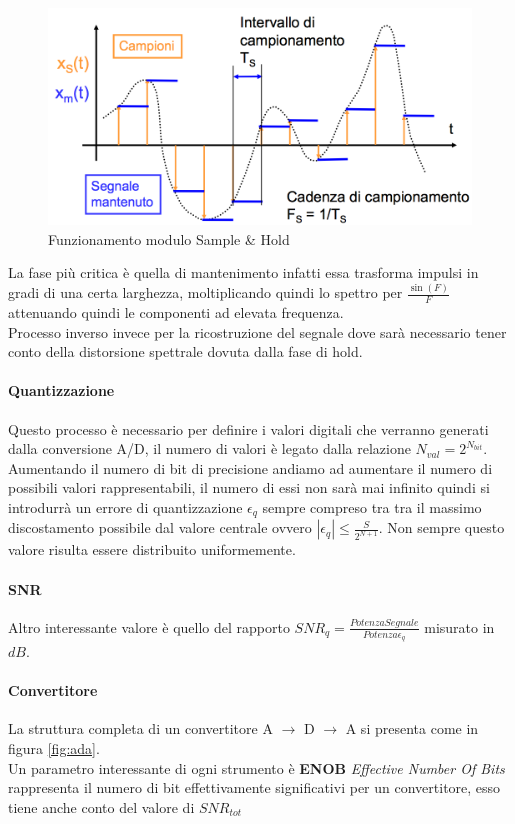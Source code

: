 \documentclass[12pt]{article}
\begin{document}
\begin{figure}[!hpt]
  \includegraphics[width=\textwidth]{images/seh.png}
  \caption{Funzionamento modulo Sample \& Hold}
  \label{fig:seh}
\end{figure}

La fase più critica è quella di mantenimento infatti essa trasforma impulsi in gradi di una certa larghezza, moltiplicando quindi lo spettro per $\frac{\sin(F)}{F}$ attenuando quindi le componenti ad elevata frequenza.\\
Processo inverso invece per la ricostruzione del segnale dove sarà necessario tener conto della distorsione spettrale dovuta dalla fase di hold.

\paragraph{Quantizzazione} Questo processo è necessario per definire i valori digitali che verranno generati dalla conversione A/D, il numero di valori è legato dalla relazione $N_{val}=2^{N_{bit}}$. Aumentando il numero di bit di precisione andiamo ad aumentare il numero di possibili valori rappresentabili, il numero di essi non sarà mai infinito quindi si introdurrà un errore di quantizzazione $\epsilon_{q}$ sempre compreso tra tra il massimo discostamento possibile dal valore centrale ovvero $|\epsilon_{q}| \leq \frac{S}{2^{N+1}}$. Non sempre questo valore risulta essere distribuito uniformemente.

\paragraph{SNR} Altro interessante valore è quello del rapporto $SNR_{q}=\frac{Potenza Segnale}{Potenza\epsilon_{q}}$ misurato in $dB$.

\paragraph{Convertitore} La struttura completa di un convertitore A $\rightarrow$ D $\rightarrow$ A si presenta come in figura \ref{fig:ada}.\\
Un parametro interessante di ogni strumento è \textbf{ENOB} \textit{Effective Number Of Bits} rappresenta il numero di bit effettivamente significativi per un convertitore, esso tiene anche conto del valore di $SNR_{tot}$
\end{document}
